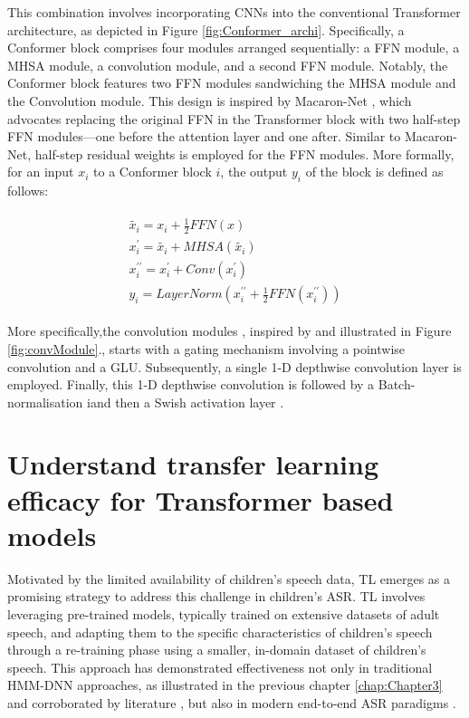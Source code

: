 This combination involves incorporating \acp{CNN} into the conventional Transformer architecture, as depicted in Figure \ref{fig:Conformer_archi}. Specifically, a Conformer block comprises four modules arranged sequentially: a \ac{FFN} module, a \ac{MHSA} module, a convolution module, and a second \ac{FFN} module. Notably, the Conformer block features two \ac{FFN} modules sandwiching the \ac{MHSA} module and the Convolution module. This design is inspired by Macaron-Net \cite{lu2019understanding}, which advocates replacing the original \ac{FFN} in the Transformer block with two half-step \ac{FFN} modules—one before the attention layer and one after. Similar to Macaron-Net, half-step residual weights is employed for the \ac{FFN} modules. More formally, for an input $x_i$ to a Conformer block $i$, the output $y_i$ of the block is defined as follows:


\begin{align}
    \begin{split}
    \tilde{x_i} = x_i + \frac{1}{2}FFN(x) \\
    x_i^{\prime} =\tilde{x_i} + MHSA(\tilde{x_i}) \\
    x_i^{\prime\prime} = x_i^{\prime} + Conv(x_i^{\prime}) \\
    y_i = LayerNorm(x_i^{\prime\prime} + \frac{1}{2}FFN(x_i^{\prime\prime}))
    \end{split}
\end{align}

More specifically,the convolution modules , inspired by \cite{wu2020lite} and illustrated in Figure \ref{fig:convModule}., starts with a gating mechanism \cite{dauphin2017language} involving a pointwise convolution and a \ac{GLU}. Subsequently, a single 1-D depthwise convolution layer is employed. Finally, this 1-D depthwise convolution is followed by a Batch-normalisation iand then a Swish activation layer \cite{Prajit2017Searching}.


\section{Understand transfer learning efficacy for Transformer based models}
Motivated by the limited availability of children's speech data, \ac{TL} emerges as a promising strategy to address this challenge in children's \ac{ASR}. \ac{TL} involves leveraging pre-trained models, typically trained on extensive datasets of adult speech, and adapting them to the specific characteristics of children's speech through a re-training phase using a smaller, in-domain dataset of children's speech. This approach has demonstrated effectiveness not only in traditional \ac{HMM-DNN} approaches, as illustrated in the previous chapter \ref{chap:Chapter3} and corroborated by literature \cite{shivakumar2020transfer}, but also in modern end-to-end \ac{ASR} paradigms \cite{sri_end2end,gelin2021endtoend}.

